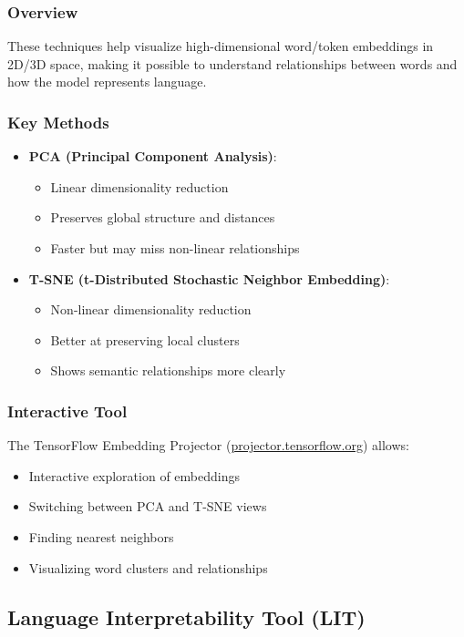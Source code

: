 \documentclass{article}
\begin{document}
\subsubsection{Overview}
These techniques help visualize high-dimensional word/token embeddings in 2D/3D space, making it possible to understand relationships between words and how the model represents language.

\subsubsection{Key Methods}
\begin{itemize}
    \item \textbf{PCA (Principal Component Analysis)}:
        \begin{itemize}
            \item Linear dimensionality reduction
            \item Preserves global structure and distances
            \item Faster but may miss non-linear relationships
        \end{itemize}
    \item \textbf{T-SNE (t-Distributed Stochastic Neighbor Embedding)}:
        \begin{itemize}
            \item Non-linear dimensionality reduction
            \item Better at preserving local clusters
            \item Shows semantic relationships more clearly
        \end{itemize}
\end{itemize}

\subsubsection{Interactive Tool}
The TensorFlow Embedding Projector (\url{projector.tensorflow.org}) allows:
\begin{itemize}
    \item Interactive exploration of embeddings
    \item Switching between PCA and T-SNE views
    \item Finding nearest neighbors
    \item Visualizing word clusters and relationships
\end{itemize}

\subsection{Language Interpretability Tool (LIT)}
\end{document}
